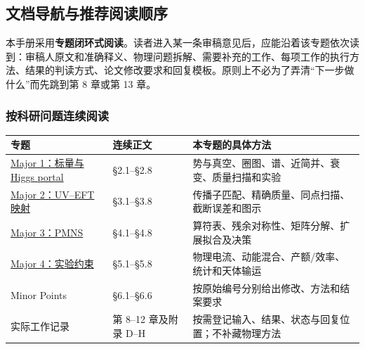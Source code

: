 \documentclass[
  chinese,
  UTF8]{ctexart}
\newcounter{none} %
\begin{document}
\subsection{文档导航与推荐阅读顺序}\label{ux6587ux6863ux5bfcux822aux4e0eux63a8ux8350ux9605ux8bfbux987aux5e8f}

本手册采用\textbf{专题闭环式阅读}。读者进入某一条审稿意见后，应能沿着该专题依次读到：审稿人原文和准确释义、物理问题拆解、需要补充的工作、每项工作的执行方法、结果的判读方式、论文修改要求和回复模板。原则上不必为了弄清``下一步做什么''而先跳到第
8 章或第 13 章。

\subsubsection{按科研问题连续阅读}\label{ux6309ux79d1ux7814ux95eeux9898ux8fdeux7eedux9605ux8bfb}

{\def\LTcaptype{none} %
\begin{longtable}[]{@{}
  >{\raggedright\arraybackslash}p{}
  >{\raggedright\arraybackslash}p{}
  >{\raggedright\arraybackslash}p{}@{}}
\toprule\noalign{}
\begin{minipage}[b]{\linewidth}\raggedright
专题
\end{minipage} & \begin{minipage}[b]{\linewidth}\raggedright
连续正文
\end{minipage} & \begin{minipage}[b]{\linewidth}\raggedright
本专题的具体方法
\end{minipage} \\
\midrule\noalign{}
\endhead
\bottomrule\noalign{}
\endlastfoot
\hyperref[major-1]{Major 1：标量与 Higgs portal} & §2.1--§2.8 &
势与真空、圈图、谱、近简并、衰变、质量扫描和实验 \\
\hyperref[major-2]{Major 2：UV--EFT 映射} & §3.1--§3.8 &
传播子匹配、精确质量、同点扫描、截断误差和图示 \\
\hyperref[major-3]{Major 3：PMNS} & §4.1--§4.8 &
算符表、残余对称性、矩阵分解、扩展拟合及决策 \\
\hyperref[major-4]{Major 4：实验约束} & §5.1--§5.8 &
物理电流、动能混合、产额/效率、统计和天体输运 \\
Minor Points & §6.1--§6.6 & 按原始编号分别给出修改、方法和结案要求 \\
实际工作记录 & 第 8--12 章及附录 D--H &
按需登记输入、结果、状态与回复位置；不补藏物理方法 \\
\end{longtable}
}
\end{document}
